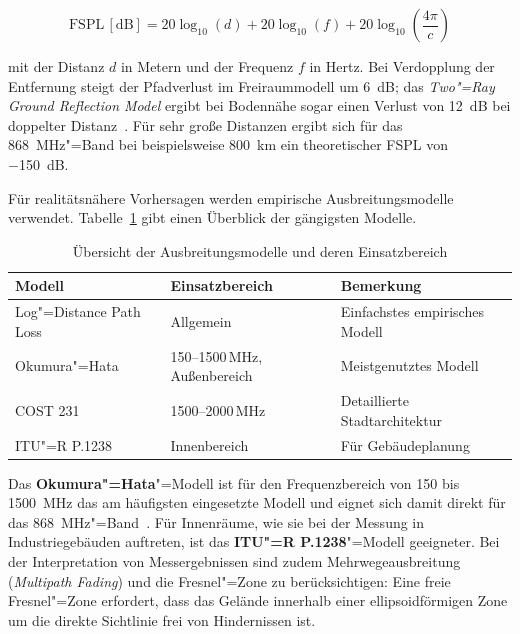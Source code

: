 \begin{equation}
  \text{FSPL} \, [\si{\dB}] = 20 \log_{10}(d) + 20 \log_{10}(f)
                              + 20 \log_{10}\!\left(\frac{4\pi}{c}\right)
  \label{eq:fspl}
\end{equation}

mit der Distanz $d$ in Metern und der Frequenz $f$ in Hertz. Bei Verdopplung der
Entfernung steigt der Pfadverlust im Freiraummodell um \SI{6}{\dB}; das
\textit{Two"=Ray Ground Reflection Model} ergibt bei Bodennähe sogar einen Verlust
von \SI{12}{\dB} bei doppelter Distanz~\cite{dobkin2012rf}. Für sehr große Distanzen
ergibt sich für das \SI{868}{\MHz}"=Band bei beispielsweise \SI{800}{\km} ein
theoretischer FSPL von \SI{-150}{\dB}.

Für realitätsnähere Vorhersagen werden empirische Ausbreitungsmodelle verwendet.
Tabelle~\ref{tab:ausbreitungsmodelle} gibt einen Überblick der gängigsten Modelle.

\begin{table}[htbp]
  \centering
  \caption{Übersicht der Ausbreitungsmodelle und deren Einsatzbereich}
  \label{tab:ausbreitungsmodelle}
  \begin{tabular}{@{}lll@{}}
    \toprule
    \textbf{Modell} & \textbf{Einsatzbereich} & \textbf{Bemerkung} \\
    \midrule
    Log"=Distance Path Loss & Allgemein & Einfachstes empirisches Modell \\
    Okumura"=Hata            & 150--1500\,MHz, Außenbereich & Meistgenutztes Modell \\
    COST 231                 & 1500--2000\,MHz              & Detaillierte Stadtarchitektur \\
    ITU"=R P.1238            & Innenbereich                 & Für Gebäudeplanung \\
    \bottomrule
  \end{tabular}
\end{table}

Das \textbf{Okumura"=Hata}"=Modell ist für den Frequenzbereich von 150 bis
\SI{1500}{\MHz} das am häufigsten eingesetzte Modell und eignet sich damit direkt für
das \SI{868}{\MHz}"=Band~\cite{haslett2008essentials}. Für Innenräume, wie sie
bei der Messung in Industriegebäuden auftreten, ist das \textbf{ITU"=R P.1238}"=Modell
geeigneter. Bei der Interpretation von Messergebnissen sind zudem
Mehrwegeausbreitung (\textit{Multipath Fading}) und die Fresnel"=Zone zu
berücksichtigen: Eine freie Fresnel"=Zone erfordert, dass das Gelände innerhalb einer
ellipsoidförmigen Zone um die direkte Sichtlinie frei von Hindernissen ist.

